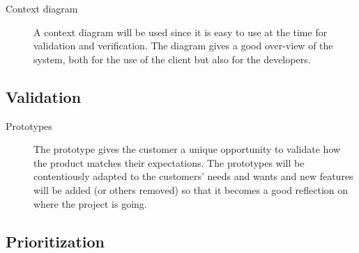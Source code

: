 \documentclass[10pt,a4paper]{article}
\begin{document}
\begin{description}
\item[Context diagram] A context diagram will be used since it is easy to use at the time for validation and verification. The diagram gives a good over-view of the system, both for the use of the client but also for the developers. 
\end{description}

\subsection{Validation}
\begin{description}
\item[Prototypes] The prototype gives the customer a unique opportunity to validate how the product matches their expectations. The prototypes will be contentiously adapted to the customers' needs and wants and new features will be added (or others removed) so that it becomes a good reflection on where the project is going. 
\end{description}


\subsection{Prioritization}



\end{document}
